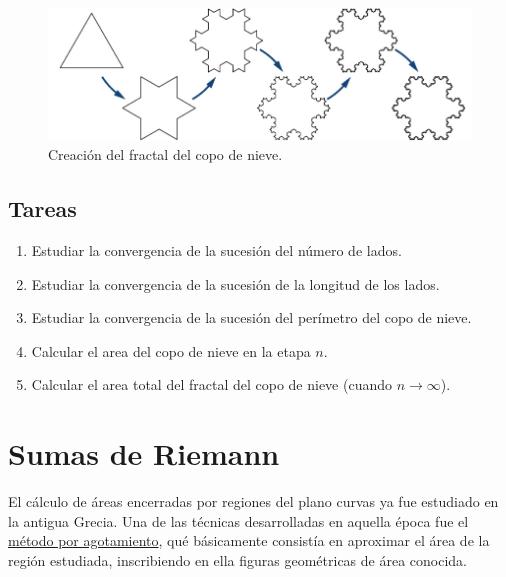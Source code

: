 \documentclass[
  a4paper,
]{scrreport}
\begin{document}
\begin{figure}

{\centering \includegraphics{img/series/copo-nieve.png}

}

\caption{Creación del fractal del copo de nieve.}

\end{figure}

\hypertarget{tareas-1}{%
\section{Tareas}\label{tareas-1}}

\begin{enumerate}
\def\labelenumi{\arabic{enumi}.}
\item
  Estudiar la convergencia de la sucesión del número de lados.
\item
  Estudiar la convergencia de la sucesión de la longitud de los lados.
\item
  Estudiar la convergencia de la sucesión del perímetro del copo de
  nieve.
\item
  Calcular el area del copo de nieve en la etapa \(n\).
\item
  Calcular el area total del fractal del copo de nieve (cuando
  \(n\to \infty\)).
\end{enumerate}


\hypertarget{sumas-de-riemann}{%
\chapter{Sumas de Riemann}\label{sumas-de-riemann}}

El cálculo de áreas encerradas por regiones del plano curvas ya fue
estudiado en la antigua Grecia. Una de las técnicas desarrolladas en
aquella época fue el
\href{https://es.wikipedia.org/wiki/M\%C3\%A9todo_por_agotamiento}{método
por agotamiento}, qué básicamente consistía en aproximar el área de la
región estudiada, inscribiendo en ella figuras geométricas de área
conocida.
\end{document}
